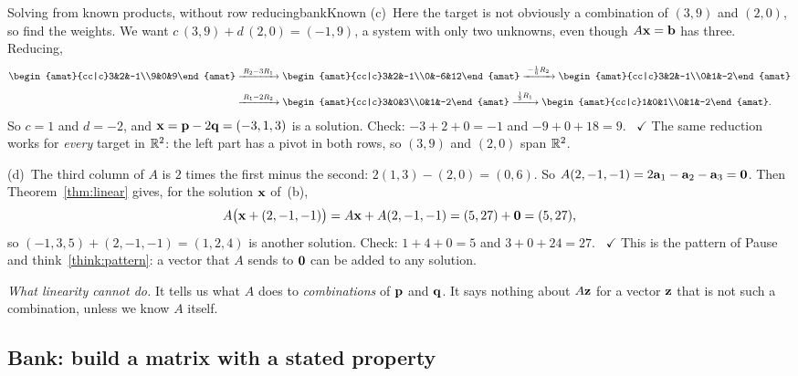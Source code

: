 \documentclass[11pt]{article}
\begin{document}
\begin{exmp}{Solving from known products, without row reducing}{bankKnown}
(c)~Here the target is not obviously a combination of $(3,9)$ and $(2,0)$, so find the weights. We want $c\,(3,9)+d\,(2,0)=(-1,9)$, a system with only two unknowns, even though $A\mathbf{x}=\mathbf{b}$ has three. Reducing,
\begin{align*}
\begin{amat}{cc|c}3&2&-1\\9&0&9\end{amat}
&\rops{R_2-3R_1}
\begin{amat}{cc|c}3&2&-1\\0&-6&12\end{amat}
\rops{-\frac16R_2}
\begin{amat}{cc|c}3&2&-1\\0&1&-2\end{amat}\\[4pt]
&\rops{R_1-2R_2}
\begin{amat}{cc|c}3&0&3\\0&1&-2\end{amat}
\rops{\frac13R_1}
\begin{amat}{cc|c}1&0&1\\0&1&-2\end{amat}.
\end{align*}
So $c=1$ and $d=-2$, and $\mathbf{x}=\mathbf{p}-2\mathbf{q}=(-3,1,3)$ is a solution. Check: $-3+2+0=-1$ and $-9+0+18=9$. \ $\checkmark$ The same reduction works for \emph{every} target in $\mathbb{R}^2$: the left part has a pivot in both rows, so $(3,9)$ and $(2,0)$ span $\mathbb{R}^2$.

(d)~The third column of $A$ is $2$ times the first minus the second: $2(1,3)-(2,0)=(0,6)$. So $A(2,-1,-1)=2\mathbf{a}_1-\mathbf{a}_2-\mathbf{a}_3=\mathbf{0}$. Then Theorem~\ref{thm:linear} gives, for the solution $\mathbf{x}$ of~(b),
\[
A\bigl(\mathbf{x}+(2,-1,-1)\bigr)=A\mathbf{x}+A(2,-1,-1)=(5,27)+\mathbf{0}=(5,27),
\]
so $(-1,3,5)+(2,-1,-1)=(1,2,4)$ is another solution. Check: $1+4+0=5$ and $3+0+24=27$. \ $\checkmark$ This is the pattern of Pause and think~\ref{think:pattern}: a vector that $A$ sends to $\mathbf{0}$ can be added to any solution.

\emph{What linearity cannot do.} It tells us what $A$ does to \emph{combinations} of $\mathbf{p}$ and $\mathbf{q}$. It says nothing about $A\mathbf{z}$ for a vector $\mathbf{z}$ that is not such a combination, unless we know $A$ itself.
\end{exmp}

\subsection*{Bank: build a matrix with a stated property}
\end{document}
